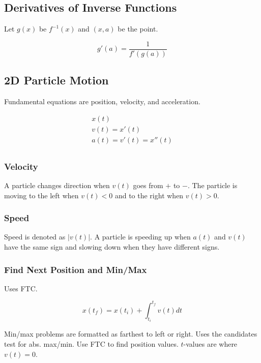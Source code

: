 \subsection{Derivatives of Inverse Functions}\label{subsec:derivatives-of-inverse-functions}

Let $g(x)$ be $f^{-1}(x)$ and $(x,a)$ be the point.

\[g'(a)=\frac{1}{f'(g(a))}\]

\subsection{2D Particle Motion}\label{subsec:2d-particle-motion}

Fundamental equations are position, velocity, and acceleration.

\begin{gather*}
    x(t)\\
    v(t)=x'(t)\\
    a(t)=v'(t)=x''(t)\\
\end{gather*}

\subsubsection{Velocity}

A particle changes direction when $v(t)$ goes from $+$ to $-$.
The particle is moving to the left when $v(t)<0$ and to the right 
when $v(t)>0$.

\subsubsection{Speed}

Speed is denoted as $|v(t)|$.
A particle is speeding up when
$a(t)$ and $v(t)$ have the same sign and slowing down when they have
different signs.

\subsubsection{Find Next Position and Min/Max}

Uses FTC.

\[x(t_f)=x(t_i)+\int_{t_i}^{t_f}v(t)dt\]

Min/max problems are formatted as farthest to left or right.
Uses the candidates test for abs. max/min.
Use FTC to find position values. $t$-values are where $v(t)=0$.

\bigskip

